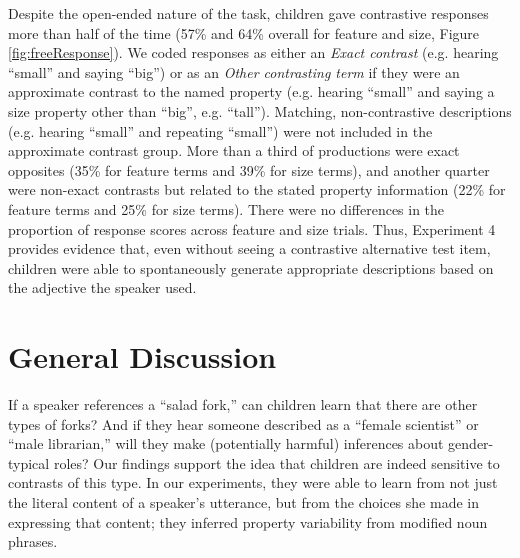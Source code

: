 \documentclass[man]{apa2}
\begin{document}
Despite the open-ended nature of the task, children gave contrastive responses more than half of the time (57\% and 64\% overall for feature and size, Figure \ref{fig:freeResponse}).  We coded responses as either an \emph{Exact contrast} (e.g. hearing ``small'' and saying ``big'') or as an \emph{Other contrasting term} if they were an approximate contrast to the named property (e.g. hearing ``small'' and saying a size property other than ``big'', e.g. ``tall''). Matching, non-contrastive descriptions (e.g. hearing ``small'' and repeating ``small'') were not included in the approximate contrast group. More than a third of productions were exact opposites (35\% for feature terms and 39\% for size terms), and another quarter were non-exact contrasts but related to the stated property information (22\% for feature terms and 25\% for size terms). There were no differences in the proportion of response scores across feature and size trials. Thus, Experiment 4 provides evidence that, even without seeing a contrastive alternative test item, children were able to spontaneously generate appropriate descriptions based on the adjective the speaker used. 

\section{General Discussion}

If a speaker references a ``salad fork,'' can children learn that there are other types of forks? And if they hear someone described as a ``female scientist'' or ``male librarian,'' will they make (potentially harmful) inferences about gender-typical roles? Our findings support the idea that children are indeed sensitive to contrasts of this type. In our experiments, they were able to learn from not just the literal content of a speaker's utterance, but from the choices she made in expressing that content; they inferred property variability from modified noun phrases.
\end{document}
